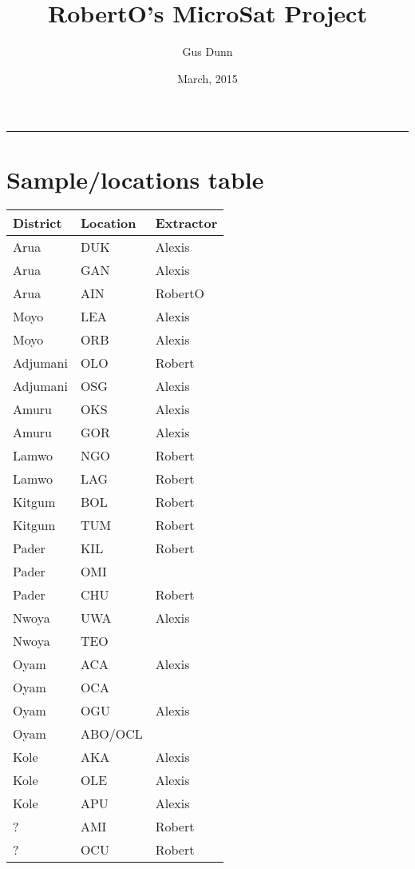 \documentclass[letterpaper]{scrartcl}
\title{RobertO's MicroSat Project\\\vspace{0.5em}{\large Caccone PostDoc}}
\author{Gus Dunn}
\date{March, 2015}
\begin{document}
\maketitle

{
\hypersetup{linkcolor=black}
\setcounter{tocdepth}{3}
\tableofcontents
}
\begin{center}\rule{0.5\linewidth}{\linethickness}\end{center}

\newpage

\section{Sample/locations table}\label{samplelocations-table}

\begin{longtable}[c]{@{}lll@{}}
\toprule
District & Location & Extractor\tabularnewline
\midrule
\endhead
Arua & DUK & Alexis\tabularnewline
Arua & GAN & Alexis\tabularnewline
Arua & AIN & RobertO\tabularnewline
Moyo & LEA & Alexis\tabularnewline
Moyo & ORB & Alexis\tabularnewline
Adjumani & OLO & Robert\tabularnewline
Adjumani & OSG & Alexis\tabularnewline
Amuru & OKS & Alexis\tabularnewline
Amuru & GOR & Alexis\tabularnewline
Lamwo & NGO & Robert\tabularnewline
Lamwo & LAG & Robert\tabularnewline
Kitgum & BOL & Robert\tabularnewline
Kitgum & TUM & Robert\tabularnewline
Pader & KIL & Robert\tabularnewline
Pader & OMI &\tabularnewline
Pader & CHU & Robert\tabularnewline
Nwoya & UWA & Alexis\tabularnewline
Nwoya & TEO &\tabularnewline
Oyam & ACA & Alexis\tabularnewline
Oyam & OCA &\tabularnewline
Oyam & OGU & Alexis\tabularnewline
Oyam & ABO/OCL &\tabularnewline
Kole & AKA & Alexis\tabularnewline
Kole & OLE & Alexis\tabularnewline
Kole & APU & Alexis\tabularnewline
? & AMI & Robert\tabularnewline
? & OCU & Robert\tabularnewline
\bottomrule
\end{longtable}
\end{document}
